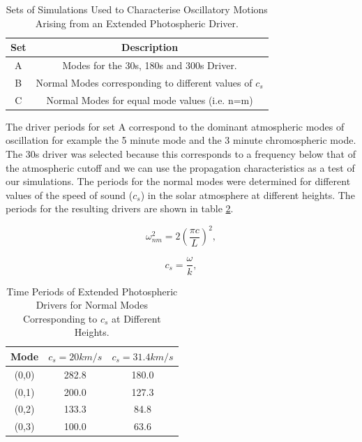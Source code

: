 \documentclass{aa}
\begin{document}
\begin{table}\label{simsetstab}
\centering
\begin{tabular}{c c }
\hline
Set   &  Description\\
\hline
A &  Modes for the 30s, 180s and 300s Driver. \\
\hline
B &  Normal Modes corresponding to different values of $c_s$ \\
\hline
C & Normal Modes for equal mode values (i.e. n=m)  \\
\hline
\end{tabular} 
\caption{Sets of Simulations Used to Characterise Oscillatory Motions Arising from an Extended Photospheric Driver.}
\end{table}

The driver periods for set A correspond to the dominant atmospheric modes of oscillation for example the 5 minute mode and the 3 minute chromospheric mode. The 30s driver was selected because this corresponds to a frequency below that of the atmospheric cutoff and we can use the propagation characteristics as a test of our simulations. The periods for the normal modes were determined for different values of the speed of sound ($c_s$) in the solar atmosphere at different heights. The periods for the resulting drivers are shown in table \ref{simperiods}.

\begin{equation}\label{normmodedrvfreq}
\omega_{nm}^{2}= 2\left(   \frac{\pi c}{L} \right) ^{2},
\end{equation}

\begin{equation}\label{normmodecs}
c_s= \frac{\omega}{k},
\end{equation}

\begin{table}\label{simperiods}
\centering
\begin{tabular}{c c c }
\hline
Mode   &  $c_s=20km/s$ &  $c_s=31.4km/s$ \\
\hline
(0,0) & 282.8 & 180.0 \\
\hline
(0,1) & 200.0 & 127.3  \\
\hline
(0,2) & 133.3 & 84.8  \\
\hline
(0,3) & 100.0 & 63.6  \\
\hline
\end{tabular} 
\caption{Time Periods of Extended Photospheric Drivers for Normal Modes Corresponding to $c_s$ at Different Heights.}
\end{table}
\end{document}
